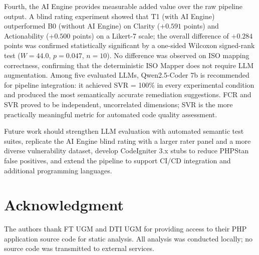 \documentclass[conference]{IEEEtran}
\begin{document}
Fourth, the AI Engine provides measurable added value over the
raw pipeline output. A blind rating experiment showed that T1
(with AI Engine) outperformed B0 (without AI Engine) on Clarity
($+0.591$ points) and Actionability ($+0.500$ points) on a Likert-7
scale; the overall difference of $+0.284$ points was confirmed
statistically significant by a one-sided Wilcoxon signed-rank test
($W = 44.0$, $p = 0.047$, $n = 10$). No difference was observed on
ISO mapping correctness, confirming that the deterministic ISO Mapper
does not require LLM augmentation. Among five evaluated LLMs,
Qwen2.5-Coder 7b is recommended for pipeline integration: it achieved
SVR = 100\% in every experimental condition and produced the most
semantically accurate remediation suggestions. FCR and SVR proved to
be independent, uncorrelated dimensions; SVR is the more practically
meaningful metric for automated code quality assessment.

Future work should strengthen LLM evaluation with automated semantic
test suites, replicate the AI Engine blind rating with a larger rater
panel and a more diverse vulnerability dataset, develop
CodeIgniter 3.x stubs to reduce PHPStan false positives, and extend
the pipeline to support CI/CD integration and additional programming
languages.

\section*{Acknowledgment}

The authors thank FT UGM and DTI UGM for providing access to
their PHP application source code for static analysis. All
analysis was conducted locally; no source code was transmitted
to external services.

{}

\end{document}
